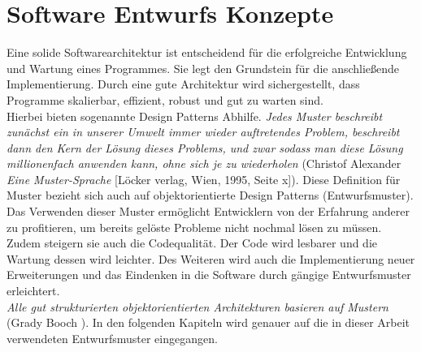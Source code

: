 \section{Software Entwurfs Konzepte}
Eine solide Softwarearchitektur ist entscheidend für die erfolgreiche Entwicklung und Wartung eines Programmes. Sie legt den Grundstein für die anschließende Implementierung. Durch eine gute Architektur wird sichergestellt, dass Programme skalierbar, effizient, robust und gut zu warten sind.\\
Hierbei bieten sogenannte Design Patterns Abhilfe. \glqq\textit{Jedes Muster beschreibt zunächst ein in unserer Umwelt immer wieder auftretendes Problem, beschreibt dann den Kern der Lösung dieses Problems, und zwar sodass man diese Lösung millionenfach anwenden kann, ohne sich je zu wiederholen}\grqq{} (Christof Alexander \textit{Eine Muster-Sprache} [Löcker verlag, Wien, 1995, Seite x]). Diese Definition für Muster bezieht sich auch auf objektorientierte Design Patterns (Entwurfsmuster). Das Verwenden dieser Muster ermöglicht Entwicklern von der Erfahrung anderer zu profitieren, um bereits gelöste Probleme nicht nochmal lösen zu müssen. Zudem steigern sie auch die Codequalität. Der Code wird lesbarer und die Wartung dessen wird leichter. Des Weiteren wird auch die Implementierung neuer Erweiterungen und das Eindenken in die Software durch gängige Entwurfsmuster erleichtert. \cite[S.25 ff]{DesignPatterns}\\
\glqq\textit{Alle gut strukturierten objektorientierten Architekturen basieren auf Mustern}\grqq{} (Grady Booch \cite[S.21]{DesignPatterns}).
In den folgenden Kapiteln wird genauer auf die in dieser Arbeit verwendeten Entwurfsmuster eingegangen.      

